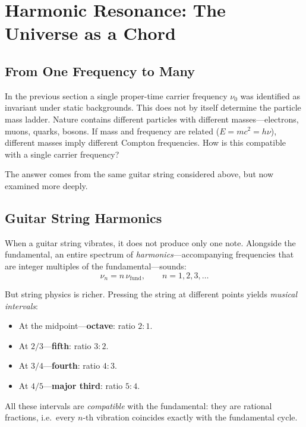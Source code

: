 \documentclass[11pt]{article}
\begin{document}
\section{Harmonic Resonance: The Universe as a Chord}
\label{sec:harmonic}

\subsection{From One Frequency to Many}

In the previous section a single proper-time carrier frequency
$\nu_0$ was identified as invariant under static backgrounds.  This
does not by itself determine the particle mass ladder.  Nature
contains different particles with different masses---electrons,
muons, quarks, bosons. If mass and frequency are related
($E = mc^2 = h\nu$), different masses imply different Compton
frequencies. How is this compatible with a single carrier
frequency?

The answer comes from the same guitar string considered above, but
now examined more deeply.

\subsection{Guitar String Harmonics}

When a guitar string vibrates, it does not produce only one note.
Alongside the fundamental, an entire spectrum of
\emph{harmonics}---accompanying frequencies that are integer
multiples of the fundamental---sounds:
\begin{equation}
  \nu_n = n\,\nu_{\mathrm{fund}}, \qquad n = 1, 2, 3, \ldots
  \label{eq:harmonics}
\end{equation}

But string physics is richer. Pressing the string at different
points yields \emph{musical intervals}:
\begin{itemize}
  \item At the midpoint---\textbf{octave}: ratio $2{:}1$.
  \item At $2/3$---\textbf{fifth}: ratio $3{:}2$.
  \item At $3/4$---\textbf{fourth}: ratio $4{:}3$.
  \item At $4/5$---\textbf{major third}: ratio $5{:}4$.
\end{itemize}
All these intervals are \emph{compatible} with the fundamental: they
are rational fractions, i.e.\ every $n$-th vibration coincides
exactly with the fundamental cycle.
\end{document}
